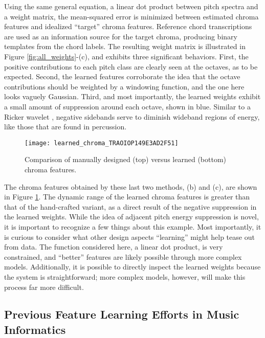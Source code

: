 Using the same general equation, a linear dot product between pitch spectra and a weight matrix, the mean-squared error is minimized between estimated chroma features and idealized ``target'' chroma features.
Reference chord transcriptions are used as an information source for the target chroma, producing binary templates from the chord labels.
The resulting weight matrix is illustrated in Figure \ref{fig:all_weights}-(c), and exhibits three significant behaviors.
First, the positive contributions to each pitch class are clearly seen at the octaves, as to be expected.
Second, the learned features corroborate the idea that the octave contributions should be weighted by a windowing function, and the one here looks vaguely Gaussian.
Third, and most importantly, the learned weights exhibit a small amount of suppression around each octave, shown in blue.
Similar to a Ricker wavelet \cite{Vaidyanathan1993Multirate}, negative sidebands serve to diminish wideband regions of energy, like those that are found in percussion.


\begin{figure}
\begin{centering}
\texttt{[image: learned\_chroma\_TRAOIOP149E3AD2F51]}
\caption{Comparison of manually designed (top) versus learned (bottom) chroma features.}
\label{fig:learned_chroma}
\end{centering}
\end{figure}

The chroma features obtained by these last two methods, (b) and (c), are shown in Figure \ref{fig:learned_chroma}.
The dynamic range of the learned chroma features is greater than that of the hand-crafted variant, as a direct result of the negative suppression in the learned weights.
While the idea of adjacent pitch energy suppression is novel, it is important to recognize a few things about this example.
Most importantly, it is curious to consider what other design aspects ``learning'' might help tease out from data.
The function considered here, a linear dot product, is very constrained, and ``better'' features are likely possible through more complex models.
Additionally, it is possible to directly inspect the learned weights because the system is straightforward; more complex models, however, will make this process far more difficult.


\subsection{Previous Feature Learning Efforts in Music Informatics}

